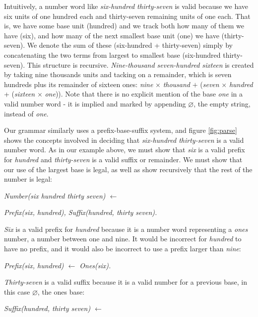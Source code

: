 \documentclass[10pt,letterpaper]{article}
\begin{document}
Intuitively, a number word like \emph{six-hundred thirty-seven} is
valid because we have six units of one hundred each and thirty-seven
remaining units of one each. That is, we have some base unit (hundred)
and we track both how many of them we have (six), and how many of the
next smallest base unit (one) we have (thirty-seven). We denote the
sum of these (six-hundred + thirty-seven) simply by concatenating the
two terms from largest to smallest base (six-hundred thirty-seven).
This structure is recursive. \emph{Nine-thousand seven-hundred
  sixteen} is created by taking nine thousands units and tacking on a
remainder, which is seven hundreds plus its remainder of sixteen ones:
\emph{nine} $\times$ \emph{thousand} $+$ (\emph{seven} $\times$
\emph{hundred} + (\emph{sixteen} $\times$ \emph{one})). Note that
there is no explicit mention of the base \emph{one} in a valid number
word - it is implied and marked by appending $\varnothing$, the empty
string, instead of \emph{one}.

Our grammar similarly uses a prefix-base-suffix system, and figure
\ref{fig:parse} shows the concepts involved in deciding that
\emph{six-hundred thirty-seven} is a valid number word. As in our
example above, we must show that \emph{six} is a valid prefix for
\emph{hundred} and \emph{thirty-seven} is a valid suffix or remainder.
We must show that our use of the largest base is legal, as well as
show recursively that the rest of the number is legal:

\vspace{.5em}
\emph{Number(six hundred thirty seven) $\leftarrow$}

\emph{Prefix(six, hundred), Suffix(hundred, thirty seven).}
\vspace{.5em}

\noindent\emph{Six} is a valid prefix for \emph{hundred} because it is
a number word representing a \emph{ones} number, a number between one
and nine. It would be incorrect for \emph{hundred} to have no prefix,
and it would also be incorrect to use a prefix larger than
\emph{nine}:

\vspace{.5em}
\emph{ Prefix(six, hundred) $\leftarrow$ Ones(six).}
\vspace{.5em}

\noindent\emph{Thirty-seven} is a valid suffix because it is a valid
number for a previous base, in this case $\varnothing$, the ones base:

\vspace{.5em}
\emph{Suffix(hundred, thirty seven) $\leftarrow$}
\end{document}
